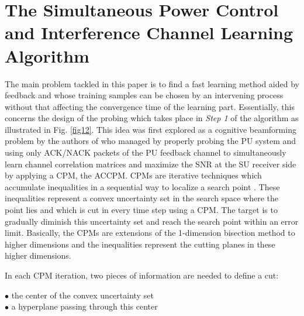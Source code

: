 \documentclass[journal]{IEEEtran}
\begin{document}
\section{The Simultaneous Power Control and Interference Channel Learning Algorithm}

The main problem tackled in this paper is to find a fast learning method aided by feedback and whose training samples can be chosen by an intervening process without that affecting the convergence time of the learning part. Essentially, this concerns the design of the probing which takes place in \textit{Step 1} of the algorithm as illustrated in Fig. \ref{fig12}. This idea was first explored as a cognitive beamforming problem by the authors of \cite{biban73} who managed by properly probing the PU system and using only ACK/NACK packets of the PU feedback channel to simultaneously learn channel correlation matrices and maximize the SNR at the SU receiver side by applying a CPM, the ACCPM. CPMs are iterative techniques which accumulate inequalities in a sequential way to localize a search point \cite{biban86}. These inequalities represent a convex uncertainty set in the search space where the point lies and which is cut in every time step using a CPM. The target is to gradually diminish this uncertainty set and reach the search point within an error limit. Basically, the CPMs are extensions of the 1-dimension bisection method to higher dimensions and the inequalities represent the cutting planes in these higher dimensions.

In each CPM iteration, two pieces of information are needed to define a cut:

\begin{description}
  \item[]
  \item[$\bullet$ the center of the convex uncertainty set]
  \item[]
  \item[$\bullet$ a hyperplane passing through this center]
  \item[]
\end{description}
\end{document}
